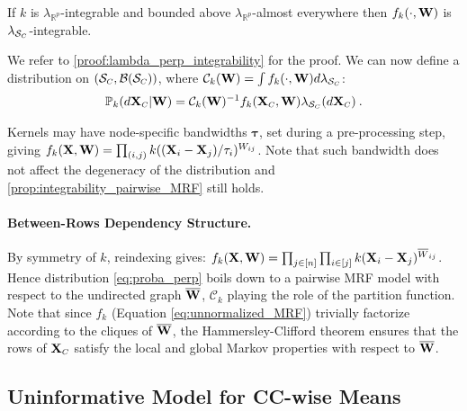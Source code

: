 \begin{theorem}\label{prop:integrability_pairwise_MRF}
If $k$ is $\lambda_{\mathbb{R}^p}$-integrable and bounded above $\lambda_{\mathbb{R}^p}$-almost everywhere then $f_{k}(\cdot, \mathbf{W})$ is $\lambda_{\mathcal{S}_{\scaleto{C}{3pt}}}$-integrable.
\end{theorem}

We refer to \cref{proof:lambda_perp_integrability} for the proof.
We can now define a distribution on $(\mathcal{S}_{\scaleto{C}{4pt}}, \mathcal{B}(\mathcal{S}_{\scaleto{C}{4pt}}))$, where $\mathcal{C}_{k}(\W) = \int f_{k}(\cdot, \W) d\lambda_{\mathcal{S}_{\scaleto{C}{3pt}}}$:
\begin{align}\label{eq:proba_perp}
\mathbb{P}_{k}(d\X_{\scaleto{C}{4pt}} | \W) = \mathcal{C}_{k}(\W)^{-1} f_{k}(\X_{\scaleto{C}{4pt}}, \W) \lambda_{\mathcal{S}_{\scaleto{C}{3pt}}}(d\X_{\scaleto{C}{4pt}}) \: .
\end{align}

\begin{remark}
Kernels may have node-specific bandwidths $\bm{\tau}$, set during a pre-processing step, giving $f_{k}(\mathbf{X},\mathbf{W}) = \prod_{(i,j)} k((\mathbf{X}_{i} - \mathbf{X}_{j})/\tau_{i})^{W_{ij}}$. Note that such bandwidth does not affect the degeneracy of the distribution and \cref{prop:integrability_pairwise_MRF} still holds.
\end{remark}


\paragraph{Between-Rows Dependency Structure.} By symmetry of $k$, reindexing gives: $f_{k}(\mathbf{X}, \mathbf{W}) = \prod_{j \in [n]} \prod_{i \in [j]} k(\mathbf{X}_{i} - \mathbf{X}_{j})^{\overline{W}_{ij}}$. Hence distribution \eqref{eq:proba_perp} boils down to a pairwise MRF model \citep{clifford1990markov} with respect to the undirected graph $\overline{\mathbf{W}}$, $\mathcal{C}_{k}$ playing the role of the partition function. Note that since $f_k$ (Equation \ref{eq:unnormalized_MRF}) trivially factorize according to the cliques of $\overline{\mathbf{W}}$, the Hammersley-Clifford theorem ensures that the rows of $\X_{\scaleto{C}{4pt}}$ satisfy the local and global Markov properties with respect to $\overline{\mathbf{W}}$. 

\subsection{Uninformative Model for CC-wise Means}

